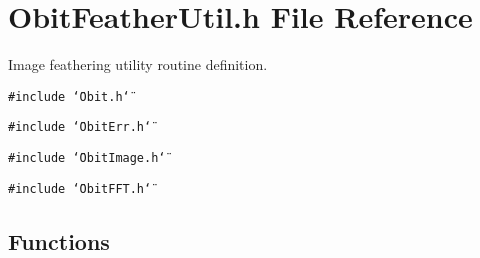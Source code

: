 \section{Obit\-Feather\-Util.h File Reference}
\label{ObitFeatherUtil_8h}
Image feathering utility routine definition. 

{\tt \#include \char`\"{}Obit.h\char`\"{}}\par
{\tt \#include \char`\"{}Obit\-Err.h\char`\"{}}\par
{\tt \#include \char`\"{}Obit\-Image.h\char`\"{}}\par
{\tt \#include \char`\"{}Obit\-FFT.h\char`\"{}}\par
\subsection*{Functions}
